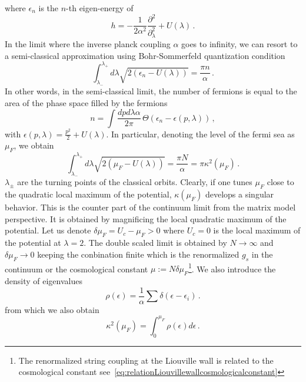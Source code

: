 \documentclass[a4paper]{article}
\begin{document}
where $\epsilon_n$ is the $n$-th eigen-energy of
\begin{equation}
  h = -\frac{1}{2\alpha^2}\frac{\partial^2}{\partial_{\lambda}^2} + U(\lambda)\,.
\end{equation}
In the limit where the inverse planck coupling $\alpha$ goes to infinity, we can resort to a semi-classical approximation using Bohr-Sommerfeld quantization condition
\begin{equation}
  \int_{\lambda_-}^{\lambda_+} d\lambda \sqrt{2\left(\epsilon_n-U(\lambda)\right)} = \frac{\pi n}{\alpha}\,.
\end{equation}
In other words, in the semi-classical limit, the number of fermions is equal to the area of the phase space filled by the fermions
\begin{equation}
  n = \int \frac{dp d\lambda \alpha}{2\pi} \,\Theta\left(\epsilon_n-\epsilon(p,\lambda)\right)\,,
\end{equation}
with $\epsilon(p,\lambda)=\frac{p^2}{2}+U(\lambda)$. In particular, denoting the level of the fermi sea as $\mu_F$, we obtain
\begin{equation}
  \int_{\lambda_-}^{\lambda_+} d\lambda \sqrt{2\left(\mu_F-U(\lambda)\right)} = \frac{\pi N}{\alpha}=\pi \kappa^2(\mu_F)\,.
\end{equation}
$\lambda_\pm$ are the turning points of the classical orbits. Clearly, if one tunes $\mu_F$ close to the quadratic local maximum of the potential, $\kappa(\mu_F)$ develops a singular behavior. This is the counter part of the continuum limit from the matrix model perspective. It is obtained by magnificing the local quadratic maximum of the potential. Let us denote $\delta \mu_F = U_{c} -  \mu_F >0$ where $U_c=0$ is the local maximum of the potential at $\lambda =2$. The double scaled limit is obtained by $N\to \infty$ and $\delta \mu_F\to 0$ keeping the conbination finite which is the renormalized $g_s$ in the continuum or the cosmological constant $\mu := N\delta \mu_F$\footnote{The renormalized string coupling at the Liouville wall is related to the cosmological constant see~\eqref{eq:relationLiouvillewallcosmologicalconstant}}. We also introduce the density of eigenvalues
\begin{equation}
  \rho (\epsilon) = \frac{1}{\alpha}\sum \delta(\epsilon - \epsilon_i)\,.
\end{equation}
from which we also obtain
\begin{equation}
  \kappa^2(\mu_F) = \int_{0}^{\mu_F} \rho(\epsilon) d\epsilon\,.
\end{equation}
\end{document}
